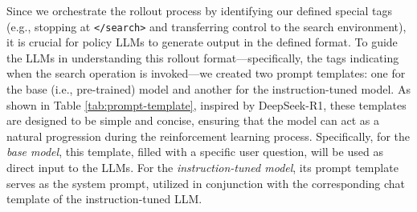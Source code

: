 \documentclass{article}
\begin{document}
Since we orchestrate the rollout process by identifying our defined special tags (e.g., stopping at \texttt{</search>} and transferring control to the search environment), it is crucial for policy LLMs to generate output in the defined format. 
To guide the LLMs in understanding this rollout format—specifically, the tags indicating when the search operation is invoked—we created two prompt templates: one for the base (i.e., pre-trained) model and another for the instruction-tuned model. As shown in Table \ref{tab:prompt-template}, inspired by DeepSeek-R1, these templates are designed to be simple and concise, ensuring that the model can act as a natural progression during the reinforcement learning process. 
Specifically, for the \textit{base model}, this template, filled with a specific user question, will be used as direct input to the LLMs. For the \textit{instruction-tuned model}, its prompt template serves as the system prompt, utilized in conjunction with the corresponding chat template of the instruction-tuned LLM.
\end{document}
